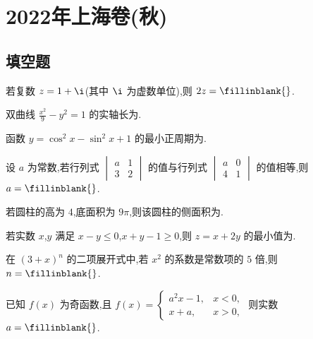 \chapter{2022年上海卷(秋)}

\section{填空题}

\begin{problem}
若复数 \(z=1+\i\)(其中 \(\i\) 为虚数单位),则 \(2z=\fillinblank{}\).
\end{problem}

\begin{problem}
双曲线 \(\frac{x^2}{9}-y^2=1\) 的实轴长为\fillinblank{}.
\end{problem}

\begin{problem}
函数 \(y=\cos^2x-\sin^2x+1\) 的最小正周期为\fillinblank{}.
\end{problem}

\begin{problem}
设 \(a\) 为常数,若行列式 \(\begin{vmatrix}a&1\\3&2\end{vmatrix}\) 的值与行列式 \(\begin{vmatrix}a&0\\4&1\end{vmatrix}\) 的值相等,则 \(a=\fillinblank{}\).
\end{problem}

\begin{problem}
若圆柱的高为 \(4\),底面积为 \(9\pi\),则该圆柱的侧面积为\fillinblank{}.
\end{problem}

\begin{problem}
若实数 \(x\),\(y\) 满足 \(x-y\le0\),\(x+y-1\ge0\),则 \(z=x+2y\) 的最小值为\fillinblank{}.
\end{problem}

\begin{problem}
在 \((3+x)^n\) 的二项展开式中,若 \(x^2\) 的系数是常数项的 \(5\) 倍,则 \(n=\fillinblank{}\).
\end{problem}

\begin{problem}
已知 \(f(x)\) 为奇函数,且 \(f(x)=\begin{cases}
a^2x-1, & x<0,\\
x+a, & x>0,
\end{cases}\) 则实数 \(a=\fillinblank{}\).
\end{problem}

